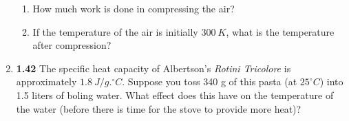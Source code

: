 \documentclass[fleqn]{article}
\begin{document}
\begin{enumerate}
\begin{enumerate}

      \item How much work is done in compressing the air?

      
      \item If the temperature of the air is initially $300 ~ K$, what is the temperature after compression?


    \end{enumerate}


    \item \textbf{1.42} The specific heat capacity of Albertson's \emph{Rotini Tricolore} is approximately $1.8 ~ J/g.^{\circ}C$. Suppose 
    you toss 340 g of this pasta (at $25^{\circ}C$) into 1.5 liters of boling water. What effect does this have on the temperature of the
    water (before there is time for the stove to provide more heat)?


  \end{enumerate}
\end{document}
